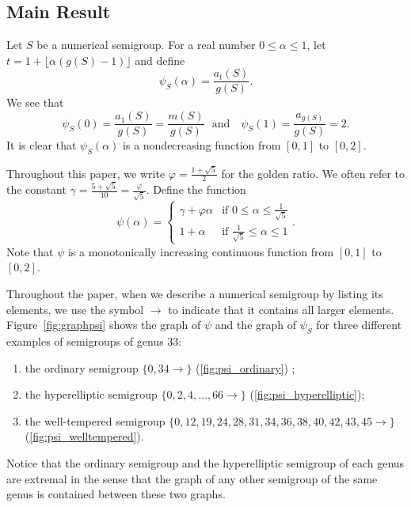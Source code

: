 \documentclass[12pt]{amsart}
\renewcommand{\phi}{\varphi}
\begin{document}
\subsection{Main Result}

Let $S$ be a numerical semigroup.  For a real number $0 \leq \alpha \leq 1$, let $t = 1 + \lfloor \alpha(g(S)-1) \rfloor$ and define
\[
\psi_S(\alpha) = \frac{a_t(S)}{g(S)}.
\]
We see that 
\[
\psi_S(0) = \frac{a_1(S)}{g(S)} = \frac{m(S)}{g(S)}\ \ \ \text{and }\ \ \ \psi_S(1) = \frac{a_{g(S)}}{g(S)} = 2.
\]
It is clear that $\psi_S(\alpha)$ is a nondecreasing function from $[0,1]$ to $[0,2]$.

Throughout this paper, we write $\varphi = \frac{1+\sqrt{5}}{2}$ for the golden ratio.  We often refer to the constant $\gamma = \frac{5+\sqrt{5}}{10} = \frac{\varphi}{\sqrt{5}}$.  Define the function 
\[
\psi(\alpha) = \begin{cases}
    \gamma +\phi \alpha &\text{if } 0\leq \alpha\leq \frac{1}{\sqrt{5}}\\
    1 + \alpha & \text{if } \frac{1}{\sqrt{5}} \leq \alpha \leq 1
\end{cases}.
\] 
Note that $\psi$ is a monotonically increasing continuous function from $[0,1]$ to $[0,2]$.

Throughout the paper, when we describe a numerical semigroup by listing its elements, we use the symbol $\rightarrow$ to indicate that it contains all larger elements.  Figure~\ref{fig:graphpsi} shows the graph of $\psi$ and the graph of $\psi_S$ for three different examples of semigroups of genus $33$: 
\begin{enumerate}[align=left, leftmargin=*]
    \item the ordinary semigroup $\{0,34\rightarrow\}$ (\ref{fig:psi_ordinary}) 
    ;
    \item the hyperelliptic semigroup $\{0,2,4,\ldots,66\rightarrow\}$ (\ref{fig:psi_hyperelliptic});
    \item the well-tempered semigroup $\{0,12,19,24,28,31,34,36,38,40,42,43,45\rightarrow\}$ (\ref{fig:psi_welltempered}).
\end{enumerate}

Notice that the ordinary semigroup and the hyperelliptic semigroup of each genus are extremal in the sense that the graph of any other semigroup of the same genus is contained between these two graphs.
\end{document}
